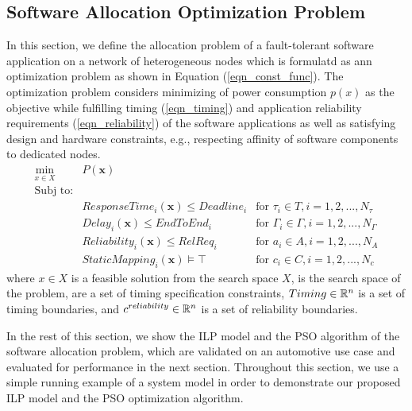 


\subsection{Software Allocation Optimization Problem	}\label{sec_allocation}
In this section, we define the allocation problem of a fault-tolerant software application on a network of heterogeneous nodes which is formulatd as ann optimization problem as shown in Equation (\ref{eqn_const_func}). The optimization problem considers minimizing of power consumption $p(x)$ as the objective while fulfilling timing (\ref{eqn_timing}) and application reliability requirements (\ref{eqn_reliability}) of the software applications as well as satisfying design and hardware constraints, e.g., respecting affinity of software components to dedicated nodes.
\begin{align}
\label{eqn_optimization}
\min_{x\in X}\;\;& P(\textbf{x}) & \\
\text{Subj to:} &\\
& ResponseTime_i(\textbf{x}) \leq Deadline_i & \text{for }\tau_i\in T, i=1,2,...,N_\tau \\ 
\label{eqn_e2e}
&Delay_i(\textbf{x}) \leq EndToEnd_i & \text{for }\Gamma_i\in \Gamma, i=1,2,...,N_\Gamma \\
\label{eqn_reliability}
&Reliability_i(\textbf{x}) \leq RelReq_i & \text{for }a_i\in A, i=1,2,...,N_A\\
\label{eqn_mapping}
&StaticMapping_i(\textbf{x})\models \top & \text{for }c_i\in C, i=1,2,...,N_c
\end{align}
where $x\in X$ is a feasible solution from the search space
$X$, is the search space of the problem,  are a set of timing specification constraints, $Timing\in \Bbb R^n$ is a set of timing boundaries, and $c^{reliability}\in \Bbb R^n$ is a set of reliability boundaries.

In the rest of this section, we show the ILP model and the PSO algorithm of the software allocation problem, which are validated on an automotive use case and evaluated for performance in the next section. Throughout this section, we use a simple running example of a system model in order to demonstrate our proposed ILP model and the PSO optimization algorithm.

